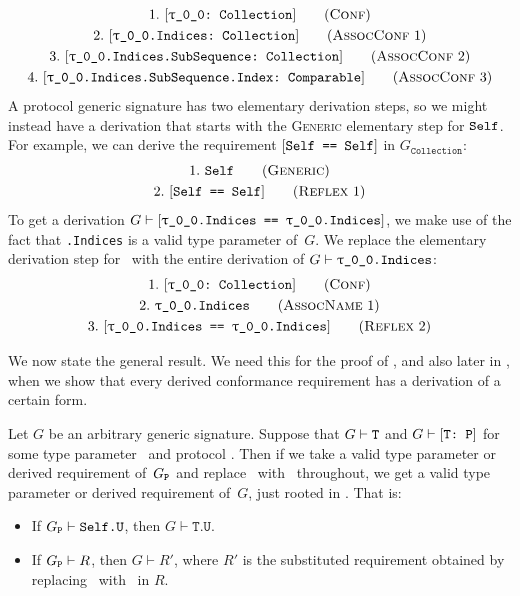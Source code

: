 \documentclass[../generics]{subfiles}
\begin{document}
\begin{gather*}
\ConfStep{\rT}{Collection}{1}\\
\AssocConfStep{1}{\rT.Indices}{Collection}{2}\\
\AssocConfStep{2}{\rT.Indices.SubSequence}{Collection}{3}\\
\AssocConfStep{3}{\rT.Indices.SubSequence.Index}{Comparable}{4}
\end{gather*}
A protocol generic signature has two elementary derivation steps, so we might instead have a derivation that starts with the \textsc{Generic} elementary step for $\texttt{Self}$. For example, we can derive the requirement $[\texttt{Self == Self}]$ in $G_\texttt{Collection}$:
\begin{gather*}
\GenericStep{Self}{1}\\
\ReflexStep{1}{Self}{2}
\end{gather*}
To get a derivation $G \vdash \SameReq{\rT.Indices}{\rT.Indices}$, we make use of the fact that \texttt{\rT.Indices} is a valid type parameter of~$G$. We replace the elementary derivation step for \tSelf\ with the entire derivation of $G \vdash \texttt{\rT.Indices}$:
\begin{gather*}
\ConfStep{\rT}{Collection}{1}\\
\AssocNameStep{1}{\rT.Indices}{2}\\
\ReflexStep{2}{\rT.Indices}{3}
\end{gather*}

We now state the general result. We need this for the proof of , and also later in , when we show that every derived conformance requirement has a derivation of a certain form.

\begin{lemma}\label{subst lemma}
Let $G$ be an arbitrary generic signature. Suppose that $G\vdash\texttt{T}$ and $G\vdash[\texttt{T:~P}]$ for some type parameter \tT\ and protocol \tP. Then if we take a valid type parameter or derived requirement of~$G_{\texttt{P}}$ and replace \tSelf\ with \tT\ throughout, we get a valid type parameter or derived requirement of~$G$, just rooted in \tT. That is:
\begin{itemize}
\item If $G_{\texttt{P}}\vdash\texttt{Self.U}$, then $G\vdash\texttt{T.U}$.
\item If $G_{\texttt{P}}\vdash R$, then $G\vdash R'$, where $R'$ is the substituted requirement obtained by replacing \tSelf\ with \tT\ in $R$.
\end{itemize}
\end{lemma}
\end{document}
